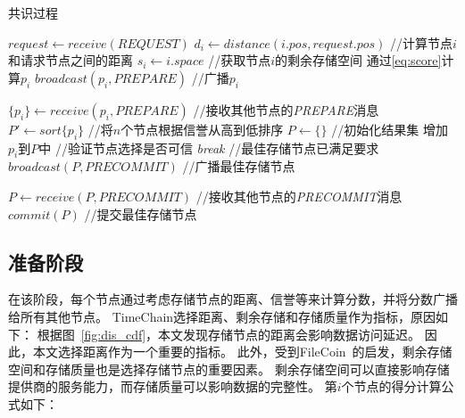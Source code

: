 \begin{algorithm}
	\caption{共识过程}
	\label{algo:consensus}
	\begin{algorithmic}[1]
        \renewcommand{\algorithmicrequire}{ \textbf{准备阶段}}
        \REQUIRE
            \STATE $request \gets \textit{receive}(REQUEST)$
                \STATE $d_i \gets \textit{distance}(i.pos, request.pos)$ //计算节点$i$和请求节点之间的距离
                \STATE $s_i \gets i.space$ //获取节点$i$的剩余存储空间
                \STATE 通过\autoref{eq:score}计算$p_i$
                \STATE $\textit{broadcast}(p_i, \textit{PREPARE})$  //广播$p_i$
            \ENDIF

        \renewcommand{\algorithmicrequire}{ \textbf{预提交阶段}}
        \REQUIRE
            \STATE $\{p_i\} \gets \textit{receive}(p_i, \textit{PREPARE})$  //接收其他节点的\textit{PREPARE}消息
                \STATE $P' \gets sort \{p_i\}$ //将$n$个节点根据信誉从高到低排序
                \STATE $P \gets \{\}$   //初始化结果集
                        \STATE \textnormal{增加$p_i$到$P$中}    //验证节点选择是否可信
                    \ENDIF
                        \STATE \textit{break}     //最佳存储节点已满足要求
                    \ENDIF
                \ENDFOR
                \STATE $\textit{broadcast}(P, \textit{PRECOMMIT})$  //广播最佳存储节点
            \ENDIF

        \renewcommand{\algorithmicrequire}{ \textbf{提交阶段}}
        \REQUIRE
            \STATE $P \gets \textit{receive}(P, \textit{PRECOMMIT})$    //接收其他节点的\textit{PRECOMMIT}消息
                \STATE $\textit{commit}(P)$ //提交最佳存储节点
            \ENDIF
	\end{algorithmic}
\end{algorithm}

\subsection{准备阶段}
在该阶段，每个节点通过考虑存储节点的距离、信誉等来计算分数，并将分数广播给所有其他节点。
TimeChain选择距离、剩余存储和存储质量作为指标，原因如下：
根据图~\autoref{fig:dis_cdf}，本文发现存储节点的距离会影响数据访问延迟。
因此，本文选择距离作为一个重要的指标。
此外，受到FileCoin~\cite{bauer2022filecoin}的启发，剩余存储空间和存储质量也是选择存储节点的重要因素。
剩余存储空间可以直接影响存储提供商的服务能力，而存储质量可以影响数据的完整性。
第$i$个节点的得分计算公式如下：

